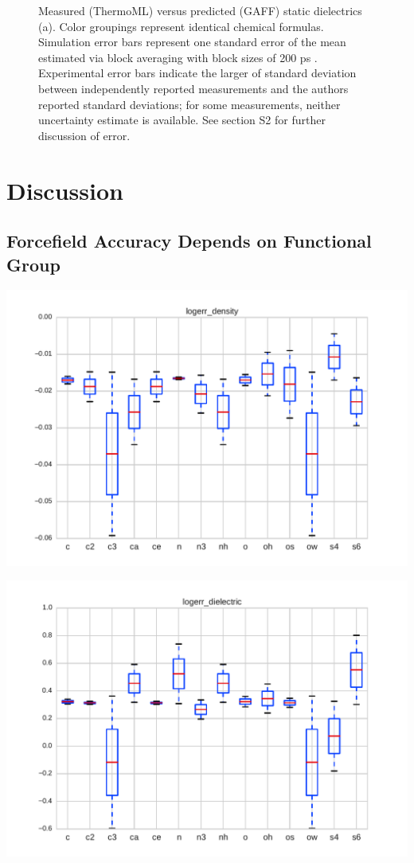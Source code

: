 \documentclass[journal=jacsat,manuscript=article]{achemso}
\begin{document}
\begin{figure}
\caption{Measured (ThermoML) versus predicted (GAFF) static dielectrics (a).  Color groupings represent identical chemical formulas.  Simulation error bars represent one standard error of the mean estimated via block averaging with block sizes of 200 ps \cite{flyvbjerg1989error}.  Experimental error bars indicate the larger of standard deviation between independently reported measurements and the authors reported standard deviations; for some measurements, neither uncertainty estimate is available.  See section S2 for further discussion of error.
}
\label{figure:Dielectric}
\end{figure}

\section{Discussion}

\subsection{Forcefield Accuracy Depends on Functional Group}

\includegraphics[width=\columnwidth]{./figures/functional_group_logerr_density.pdf}

\includegraphics[width=\columnwidth]{./figures/functional_group_logerr_dielectric.pdf}
\end{document}
